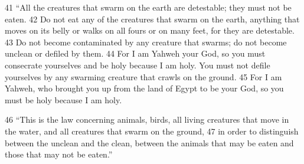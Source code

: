

41 ``All the creatures that swarm on the earth are detestable; they must not be eaten.  42 Do not eat any of the creatures that swarm on the earth, anything that moves on its belly or walks on all fours or on many feet, for they are detestable.  43 Do not become contaminated by any creature that swarms; do not become unclean or defiled by them.  44 For I am Yahweh your God, so you must consecrate yourselves and be holy because I am holy. You must not defile yourselves by any swarming creature that crawls on the ground.  45 For I am Yahweh, who brought you up from the land of Egypt to be your God, so you must be holy because I am holy.

46 ``This is the law concerning animals, birds, all living creatures that move in the water, and all creatures that swarm on the ground,  47 in order to distinguish between the unclean and the clean, between the animals that may be eaten and those that may not be eaten.''


